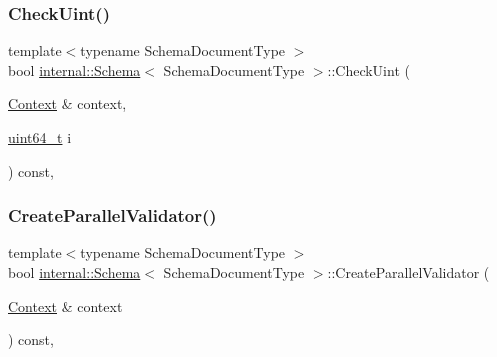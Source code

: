 \subsubsection{\texorpdfstring{Check\+Uint()}{CheckUint()}}
{\footnotesize\ttfamily template$<$typename Schema\+Document\+Type $>$ \\
bool \hyperlink{classinternal_1_1Schema}{internal\+::\+Schema}$<$ Schema\+Document\+Type $>$\+::Check\+Uint (\begin{DoxyParamCaption}\item[{\hyperlink{classinternal_1_1Schema_ac3f54abfefe300c5610c1205869cfd66}{Context} \&}]{context,  }\item[{\hyperlink{stdint_8h_aec6fcb673ff035718c238c8c9d544c47}{uint64\+\_\+t}}]{i }\end{DoxyParamCaption}) const\hspace{0.3cm}{\ttfamily [inline]}, {\ttfamily [private]}}

\mbox{\label{classinternal_1_1Schema_a8591e7af5ca64435afe99a4777bda2a1}} 
\subsubsection{\texorpdfstring{Create\+Parallel\+Validator()}{CreateParallelValidator()}}
{\footnotesize\ttfamily template$<$typename Schema\+Document\+Type $>$ \\
bool \hyperlink{classinternal_1_1Schema}{internal\+::\+Schema}$<$ Schema\+Document\+Type $>$\+::Create\+Parallel\+Validator (\begin{DoxyParamCaption}\item[{\hyperlink{classinternal_1_1Schema_ac3f54abfefe300c5610c1205869cfd66}{Context} \&}]{context }\end{DoxyParamCaption}) const\hspace{0.3cm}{\ttfamily [inline]}, {\ttfamily [private]}}

\mbox{\label{classinternal_1_1Schema_ab117799d1d57ccc4a2c3630e9b6b873a}} 
